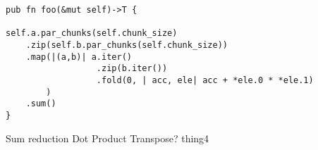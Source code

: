%
%

\begin{lstlisting}
pub fn foo(&mut self)->T {

self.a.par_chunks(self.chunk_size)
    .zip(self.b.par_chunks(self.chunk_size))
    .map(|(a,b)| a.iter()
                  .zip(b.iter())
                  .fold(0, | acc, ele| acc + *ele.0 * *ele.1)
        )
    .sum()
}
\end{lstlisting}

\choice Sum reduction
\choice Dot Product
\choice Transpose?
\choice thing4

